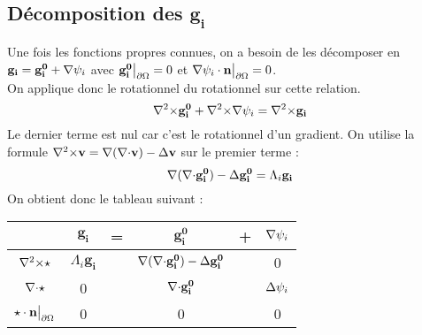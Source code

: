 \subsection{Décomposition des $\mathbf{g_i}$}
\label{decomp}

Une fois les fonctions propres connues, on a besoin de les décomposer en $\mathbf{g_i}=\mathbf{g_i^0}+{\nabla}\psi_i$ avec $\mathbf{g_i^0}{\big\rvert_{\partial\Omega}} = 0$ et ${\nabla}\psi_i\cdot \mathbf{n}{\big\rvert_{\partial\Omega}} = 0$.\\
On applique donc le rotationnel du rotationnel sur cette relation.\\
\[
{\nabla^2\times} \mathbf{g_i^0} +{\nabla^2\times}{\nabla}\psi_i = {\nabla^2\times} \mathbf{g_i}
\]
Le dernier terme est nul car c'est le rotationnel d'un gradient. On utilise la formule ${\nabla^2\times} \mathbf{v}={\nabla}({\nabla\cdot} \mathbf{v})-{\Delta} \mathbf{v}$ sur le premier terme :
\[
{\nabla}({\nabla\cdot} \mathbf{g_i^0})-{\Delta} \mathbf{g_i^0} = \Lambda_i \mathbf{g_i}
\]
On obtient donc le tableau suivant :
\begin{center}
\begin{tabular}{c|ccccc}
& $\mathbf{g_i}$ & = & $\mathbf{g_i^0}$ & + & ${\nabla}\psi_i$ \\ \hline
${\nabla^2\times}\star$ & $\Lambda_i\mathbf{g_i}$ & & ${\nabla}({\nabla\cdot} \mathbf{g_i^0})-{\Delta} \mathbf{g_i^0}$ & & 0\\ \hline
${\nabla\cdot}\star$ & 0 & & ${\nabla\cdot} \mathbf{g_i^0}$ & & ${\Delta}\psi_i$\\ \hline
$\star\cdot \mathbf{n}{\big\rvert_{\partial\Omega}}$ & 0 & & 0 & & 0
\end{tabular}
\end{center}


